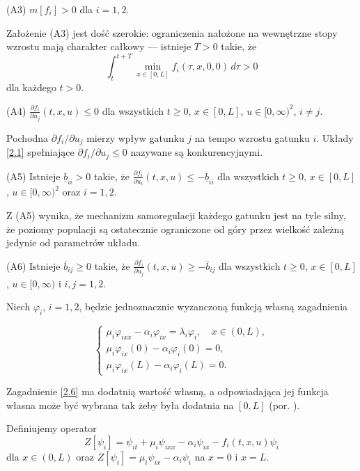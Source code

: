 	(A3) $m[f_i]>0$ dla $i=1,2$.
	
	Założenie (A3) jest dość szerokie: ograniczenia nałożone na wewnętrzne stopy wzrostu mają charakter całkowy —  
	istnieje $T>0$ takie, że
	\begin{equation}
	\int_{t}^{t+T} \min_{x\in [0,L]} f_i(\tau,x,0,0)\, d\tau >0
	\end{equation}
	dla każdego $t>0$.
	
	(A4) $\frac{\partial f_i}{\partial u_j}(t,x,u)\le 0$ dla wszystkich $t\ge 0$, $x\in [0,L]$, $u\in [0,\infty)^2$, $i\ne j$.
	
	Pochodna $\partial f_i/\partial u_j$ mierzy wpływ gatunku $j$ na tempo wzrostu gatunku $i$.  
	Układy \eqref{2.1} spełniające $\partial f_i/\partial u_j\le 0$ nazywane są konkurencyjnymi.
	
	(A5) Istnieje $\underline{b}_{ii}>0$ takie, że $\frac{\partial f_i}{\partial u_i}(t,x,u)\le -\underline{b}_{ii}$  
	dla wszystkich $t\ge 0$, $x\in [0,L]$, $u\in [0,\infty)^2$ oraz $i=1,2$.
	
	Z (A5) wynika, że mechanizm samoregulacji każdego gatunku jest na tyle silny, że poziomy populacji są ostatecznie ograniczone od góry przez wielkość zależną jedynie od parametrów układu.
	
	(A6) Istnieje $\overline{b}_{ij}\ge 0$ takie, że $\frac{\partial f_i}{\partial u_j}(t,x,u)\ge -\overline{b}_{ij}$  
	dla wszystkich $t\ge 0$, $x\in [0,L]$, $u\in [0,\infty)$ i $i,j=1,2$.
	
	\vspace{3mm}
	
	Niech $\varphi_i$, $i=1,2$, będzie jednoznacznie wyzanczoną funkcją własną zagadnienia
	
	\begin{equation}
		\label{2.6}
		\begin{cases}
			\mu_i  \varphi_{ixx}  -\alpha_i \varphi_{ix}=\lambda_i \varphi_i, \quad x\in (0,L),\\
			\mu_i \varphi_{ix}(0) - \alpha_i \varphi_i(0)=0,\\
			\mu_i \varphi_{ix}(L) - \alpha_i \varphi_i(L)=0.
		\end{cases}
	\end{equation}
	
	
	
	
	Zagadnienie \eqref{2.6} ma dodatnią wartość własną, a odpowiadająca jej funkcja własna może być wybrana tak żeby była dodatnia na $[0,L]$ (por. \cite{Lutscher}).
	
	Definiujemy operator
	\begin{equation}
	Z[\psi_i]= \psi_{it}+\mu_i\psi_{ixx}-\alpha_i\psi_{ix}-f_i(t,x,u)\psi_i
	\end{equation}
	dla $x\in(0,L)$ oraz  
	$Z[\psi_i]=\mu_i\psi_{ix}-\alpha_i\psi_i$ na $x=0$ i $x=L$.
	

